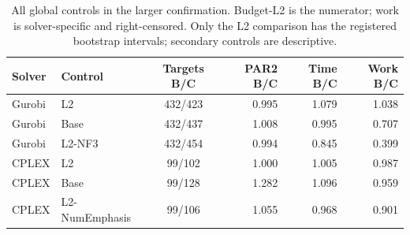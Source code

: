 \begin{table}[htbp]
\centering\small\setlength{\tabcolsep}{3pt}
\caption{All global controls in the larger confirmation. Budget-L2 is the
numerator; work is solver-specific and right-censored. Only the L2 comparison
has the registered bootstrap intervals; secondary controls are descriptive.}
\label{tab:orf-large-controls}
\begin{tabular}{llcrrr}\toprule
Solver & Control & Targets B/C & PAR2 B/C & Time B/C & Work B/C\\\midrule
Gurobi & L2 & 432/423 & 0.995 & 1.079 & 1.038\\
Gurobi & Base & 432/437 & 1.008 & 0.995 & 0.707\\
Gurobi & L2-NF3 & 432/454 & 0.994 & 0.845 & 0.399\\
CPLEX & L2 & 99/102 & 1.000 & 1.005 & 0.987\\
CPLEX & Base & 99/128 & 1.282 & 1.096 & 0.959\\
CPLEX & L2-NumEmphasis & 99/106 & 1.055 & 0.968 & 0.901\\
\bottomrule\end{tabular}\end{table}
